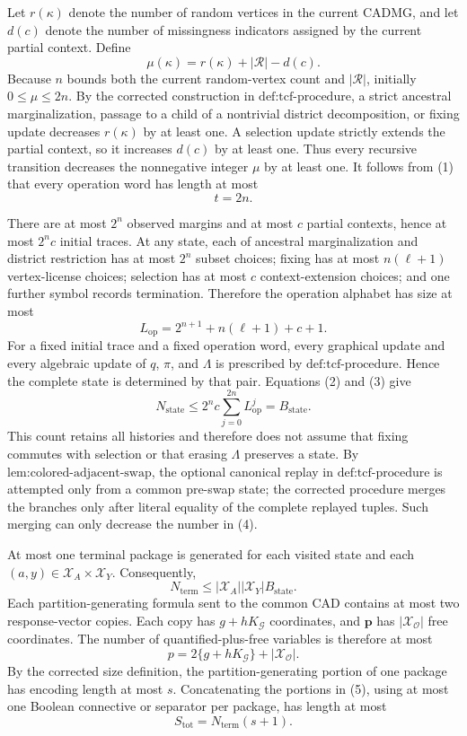 Let \(r(\kappa)\) denote the number of random vertices in the current CADMG, and let \(d(c)\) denote the number of missingness indicators assigned by the current partial context. Define
\[
\mu(\kappa)=r(\kappa)+|\mathcal R|-d(c).
\tag{1}
\]
Because \(n\) bounds both the current random-vertex count and \(|\mathcal R|\), initially \(0\leq\mu\leq2n\). By the corrected construction in \(\text{def:tcf-procedure}\), a strict ancestral marginalization, passage to a child of a nontrivial district decomposition, or fixing update decreases \(r(\kappa)\) by at least one. A selection update strictly extends the partial context, so it increases \(d(c)\) by at least one. Thus every recursive transition decreases the nonnegative integer \(\mu\) by at least one. It follows from (1) that every operation word has length at most
\[
t=2n.
\tag{2}
\]

There are at most \(2^n\) observed margins and at most \(c\) partial contexts, hence at most \(2^n c\) initial traces. At any state, each of ancestral marginalization and district restriction has at most \(2^n\) subset choices; fixing has at most \(n(\ell+1)\) vertex-license choices; selection has at most \(c\) context-extension choices; and one further symbol records termination. Therefore the operation alphabet has size at most
\[
L_{\mathrm{op}}=2^{n+1}+n(\ell+1)+c+1.
\tag{3}
\]
For a fixed initial trace and a fixed operation word, every graphical update and every algebraic update of \(q\), \(\pi\), and \(\Lambda\) is prescribed by \(\text{def:tcf-procedure}\). Hence the complete state is determined by that pair. Equations (2) and (3) give
\[
N_{\mathrm{state}}
\leq 2^n c\sum_{j=0}^{2n}L_{\mathrm{op}}^j
=B_{\mathrm{state}}.
\tag{4}
\]
This count retains all histories and therefore does not assume that fixing commutes with selection or that erasing \(\Lambda\) preserves a state. By \(\text{lem:colored-adjacent-swap}\), the optional canonical replay in \(\text{def:tcf-procedure}\) is attempted only from a common pre-swap state; the corrected procedure merges the branches only after literal equality of the complete replayed tuples. Such merging can only decrease the number in (4).

At most one terminal package is generated for each visited state and each \((a,y)\in\mathcal X_A\times\mathcal X_Y\). Consequently,
\[
N_{\mathrm{term}}
\leq |\mathcal X_A||\mathcal X_Y|B_{\mathrm{state}}.
\tag{5}
\]
Each partition-generating formula sent to the common CAD contains at most two response-vector copies. Each copy has \(g+hK_{\mathcal G}\) coordinates, and \(\mathbf p\) has \(|\mathcal X_{\mathcal O}|\) free coordinates. The number of quantified-plus-free variables is therefore at most
\[
p=2\{g+hK_{\mathcal G}\}+|\mathcal X_{\mathcal O}|.
\tag{6}
\]
By the corrected size definition, the partition-generating portion of one package has encoding length at most \(s\). Concatenating the portions in (5), using at most one Boolean connective or separator per package, has length at most
\[
S_{\mathrm{tot}}=N_{\mathrm{term}}(s+1).
\tag{7}
\]

